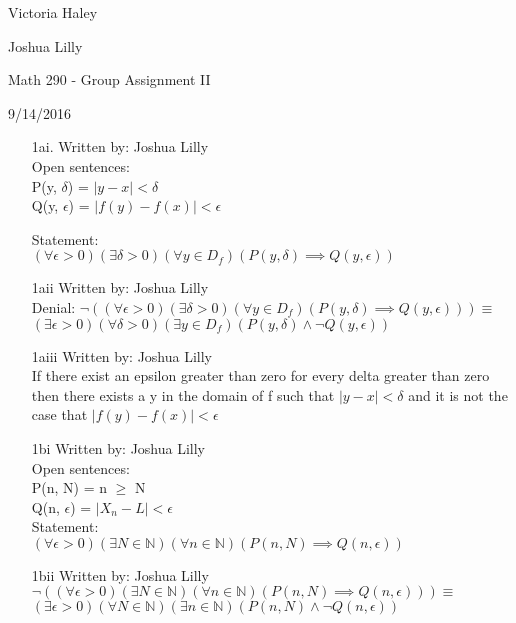 \documentclass[11pt]{article}
\begin{document}
Victoria Haley

Joshua Lilly

Math 290 - Group Assignment II

9/14/2016
\begin{flushleft}

\begin{enumerate}[widest={5.2}]

\item[1ai.] Written by: Joshua Lilly \\
Open sentences:\\
P(y, $\delta$) = $|y - x| < \delta$\\
Q(y, $\epsilon$) = $|f(y) - f(x)| < \epsilon$

Statement:\\
$(\forall \epsilon > 0) (\exists \delta > 0)(\forall y \in D_f)(P(y, \delta) \implies Q(y, \epsilon))$

\item[1aii] Written by: Joshua Lilly\\
Denial:
$\neg ((\forall \epsilon > 0) (\exists \delta > 0)(\forall y \in D_f)(P(y, \delta) \implies Q(y, \epsilon))) \equiv$\\
$(\exists \epsilon > 0)(\forall \delta > 0)(\exists y \in D_f) (P(y, \delta) \wedge \neg Q(y, \epsilon))$\\

\item[1aiii] Written by: Joshua Lilly\\
If there exist an epsilon greater than zero for every delta greater than zero then there exists a y in the domain of f such that $|y - x| < \delta$ and it is not the case that $|f(y) - f(x)| < \epsilon$\\

\item[1bi] Written by: Joshua Lilly\\
Open sentences:\\
P(n, N) = n $\geq$ N\\
Q(n, $\epsilon$) = $|X_n - L| < \epsilon$\\

Statement:\\
$(\forall \epsilon > 0)(\exists N \in \mathbb{N})(\forall n \in \mathbb{N}) (P(n, N) \implies Q(n, \epsilon))$

\item[1bii] Written by: Joshua Lilly\\
$\neg ((\forall \epsilon > 0)(\exists N \in \mathbb{N})(\forall n \in \mathbb{N}) (P(n, N) \implies Q(n, \epsilon))) \equiv$\\
$(\exists \epsilon > 0)(\forall N \in \mathbb{N})(\exists n \in \mathbb{N}) (P(n, N) \wedge \neg Q(n, \epsilon))$ 


\end{enumerate}
\end{flushleft}
\end{document}
